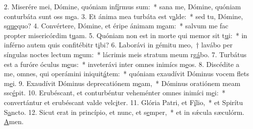 2. Miserére mei, Dómine, quóniam inf\uline{í}rmus sum:~* sana me, Dómine, quóniam conturbáta sunt oss m\uline{e}a.
3. Et ánima mea turbáta est v\uline{a}lde:~* sed tu, Dómine, s\uline{que}quo?
4. Convértere, Dómine, et éripe ánimam m\uline{e}am:~* salvum me fac propter misericórdim t\uline{u}am.
5. Quóniam non est in morte qui memor sit t\uline{u}i:~* in inférno autem quis confitébitr t\uline{i}bi?
6. Laborávi in gémitu meo,~† lavábo per síngulas noctes lectum m\uline{e}um:~* lácrimis meis stratum meum rg\uline{á}bo.
7. Turbátus est a furóre óculus m\uline{e}us:~* inveterávi inter omnes inimícs m\uline{e}os.
8. Discédite a me, omnes, qui operámini iniquit\uline{á}tem:~* quóniam exaudívit Dóminus vocem flets m\uline{e}i.
9. Exaudívit Dóminus deprecatiónem m\uline{e}am,~* Dóminus oratiónem meam ssc\uline{é}pit.
10. Erubéscant, et conturbéntur veheménter omnes inimíci m\uline{e}i:~* convertántur et erubéscant valde velc\uline{i}ter.
11. Glória Patri, et F\uline{í}lio,~* et Spirítu S\uline{a}ncto.
12. Sicut erat in princípio, et nunc, et s\uline{e}mper,~* et in sǽcula sæculórm. \uline{A}men.
